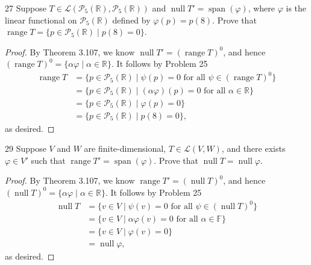 \documentclass[11pt]{extarticle}
\newenvironment{problem}[1]{\begin{prob*}{#1}{}}{\end{prob*}}
\newcommand{\R}{\mathbb{R}}
\newcommand{\F}{\mathbb{F}}
\newcommand{\poly}{\mathcal{P}}
\DeclareMathOperator{\Span}{span}
\newcommand{\Hom}{\mathcal{L}}
\DeclareMathOperator{\Null}{null}
\DeclareMathOperator{\Range}{range}
\begin{document}
\begin{problem}{27}
Suppose $T\in\Hom(\poly_5(\R), \poly_5(\R))$ and $\Null T'=\Span(\varphi)$, where $\varphi$ is the linear functional on $\poly_5(\R)$ defined by $\varphi(p) = p(8)$.  Prove that $\Range T=\{p\in\poly_5(\R)\mid p(8) = 0\}$.  
\end{problem}
\begin{proof}
By Theorem 3.107, we know $\Null T'=(\Range T)^0$, and hence $(\Range T)^0 = \{\alpha \varphi\mid \alpha\in\R\}$.  It follows by Problem 25
\begin{align*}
\Range T &= \{p\in \poly_5(\R)\mid \psi(p) =0\text{ for all }\psi\in (\Range T)^0\}\\
&= \{p\in \poly_5(\R)\mid (\alpha\varphi)(p) = 0 \text{ for all }\alpha\in\R\}\\
&= \{p\in \poly_5(\R)\mid \varphi(p) = 0 \}\\
&= \{p\in \poly_5(\R)\mid p(8) =0\},
\end{align*}
as desired.
\end{proof}

\begin{problem}{29}
Suppose $V$ and $W$ are finite-dimensional, $T\in\Hom(V,W)$, and there exists $\varphi\in V'$ such that $\Range T' = \Span(\varphi)$.  Prove that $\Null T = \Null \varphi$.  
\end{problem}
\begin{proof}
By Theorem 3.107, we know $\Range T'=(\Null T)^0$, and hence $(\Null T)^0 = \{\alpha \varphi\mid \alpha\in\R\}$.  It follows by Problem 25
\begin{align*}
\Null T &= \{v\in V\mid \psi(v) = 0\text{ for all }\psi\in(\Null T)^0\}\\
&= \{v\in V\mid \alpha\varphi(v) = 0 \text{ for all }\alpha\in \F\}\\
&= \{v \in V\mid \varphi(v) =0\}\\
&= \Null\varphi,
\end{align*}
as desired.
\end{proof}
\end{document}
